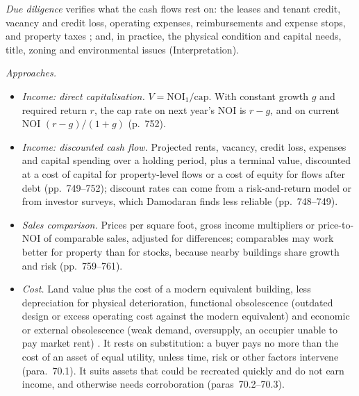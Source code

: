 \begin{qfmethod}\label{meth:real-estate-valuation-indexes}
 \emph{Due diligence} verifies what the cash flows rest on: the leases and tenant credit, vacancy and credit loss, operating expenses, reimbursements and expense stops, and property taxes \citep[pp.~750--751]{investment-valuation-2012}; and, in practice, the physical condition and capital needs, title, zoning and environmental issues (Interpretation).

\emph{Approaches.}
\begin{itemize}
\item \emph{Income: direct capitalisation.} $V=\mathrm{NOI}_1/\text{cap}$. With constant growth $g$ and required return $r$, the cap rate on next year's NOI is $r-g$, and on current NOI $(r-g)/(1+g)$ (p.~752).
\item \emph{Income: discounted cash flow.} Projected rents, vacancy, credit loss, expenses and capital spending over a holding period, plus a terminal value, discounted at a cost of capital for property-level flows or a cost of equity for flows after debt (pp.~749--752); discount rates can come from a risk-and-return model or from investor surveys, which Damodaran finds less reliable (pp.~748--749).
\item \emph{Sales comparison.} Prices per square foot, gross income multipliers or price-to-NOI of comparable sales, adjusted for differences; comparables may work better for property than for stocks, because nearby buildings share growth and risk (pp.~759--761).
\item \emph{Cost.} Land value plus the cost of a modern equivalent building, less depreciation for physical deterioration, functional obsolescence (outdated design or excess operating cost against the modern equivalent) and economic or external obsolescence (weak demand, oversupply, an occupier unable to pay market rent) \citep[paras~80.2--80.5, 90.2--90.7]{ivsc-ivs105-exposure-draft-2016}. It rests on substitution: a buyer pays no more than the cost of an asset of equal utility, unless time, risk or other factors intervene (para.~70.1). It suits assets that could be recreated quickly and do not earn income, and otherwise needs corroboration (paras~70.2--70.3).
\end{itemize}


\end{qfmethod}
